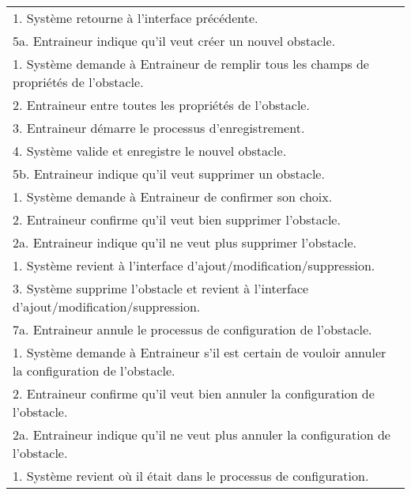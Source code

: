 \begin{longtable}{|p{16cm}|}
	\hspace{1cm}1. Système retourne à l'interface précédente.\\
	5a. Entraineur indique qu'il veut créer un nouvel obstacle.\\
	\hspace{1cm}1. Système demande à Entraineur de remplir tous les champs de propriétés de l'obstacle.\\
	\hspace{1cm}2. Entraineur entre toutes les propriétés de l'obstacle.\\
	\hspace{1cm}3. Entraineur démarre le processus d'enregistrement.\\
	\hspace{1cm}4. Système valide et enregistre le nouvel obstacle.\\
	5b. Entraineur indique qu'il veut supprimer un obstacle.\\
	\hspace{1cm}1. Système demande à Entraineur de confirmer son choix.\\
	\hspace{1cm}2. Entraineur confirme qu'il veut bien supprimer l'obstacle.\\
	\hspace{2cm}2a. Entraineur indique qu'il ne veut plus supprimer l'obstacle.\\
	\hspace{3cm}1. Système revient à l'interface d'ajout/modification/suppression.\\
	\hspace{1cm}3. Système supprime l'obstacle et revient à l'interface d'ajout/modification/suppression.\\
	7a. Entraineur annule le processus de configuration de l'obstacle.\\
	\hspace{1cm}1. Système demande à Entraineur s'il est certain de vouloir annuler la configuration de l'obstacle.\\
	\hspace{1cm}2. Entraineur confirme qu'il veut bien annuler la configuration de l'obstacle.\\
	\hspace{2cm}2a. Entraineur indique qu'il ne veut plus annuler la configuration de l'obstacle.\\
	\hspace{3cm}1. Système revient où il était dans le processus de configuration.\\

\end{longtable}
